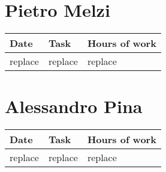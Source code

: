 \section{Pietro Melzi}
\begin{table}[H]
	\begin{tabular}{ p{2cm} p{8cm} p{3cm}}
	Date & Task & Hours of work\\
	\hline
	replace  & replace & replace \\
	\end{tabular}
\end{table}

\section{Alessandro Pina}
\begin{table}[H]
	\begin{tabular}{ p{2cm} p{8cm} p{3cm}}
	Date & Task & Hours of work\\
	\hline
	replace  & replace & replace \\
	\end{tabular}
\end{table}


